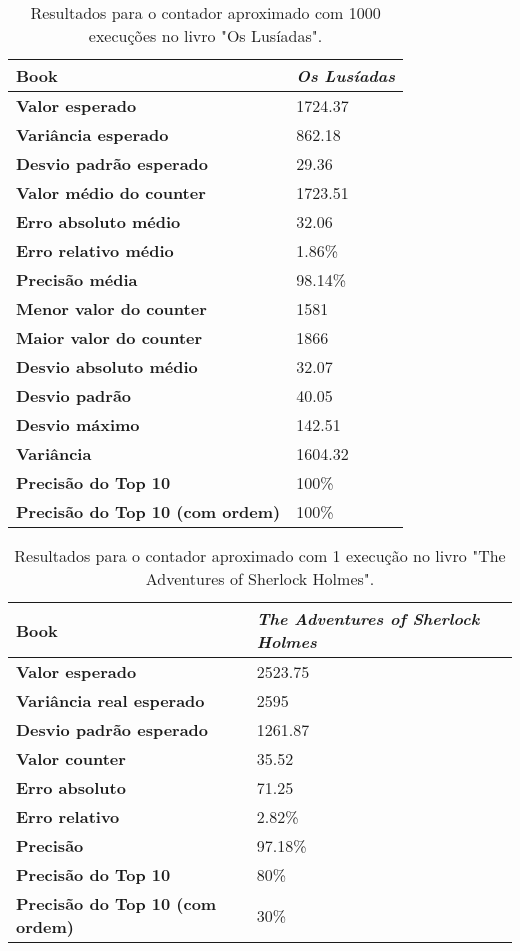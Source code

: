 \documentclass[shortpaper, portugues, times, mirror]{revdetua}
\begin{document}
\begin{table}[h!]
\centering
\begin{tabular}{|l|l|}
\hline
\textbf{Book}            & \textit{Os Lusíadas}\\ \hline
\textbf{Valor esperado}         & 1724.37\\ \hline
\textbf{Variância esperado}       & 862.18\\ \hline
\textbf{Desvio padrão esperado}   & 29.36\\ \hline
\textbf{Valor médio do counter}   & 1723.51\\ \hline
\textbf{Erro absoluto médio}   & 32.06\\ \hline
\textbf{Erro relativo médio}   & 1.86\%\\ \hline
\textbf{Precisão média}   & 98.14\%\\ \hline
\textbf{Menor valor do counter}   & 1581\\ \hline
\textbf{Maior valor do counter}   & 1866\\ \hline
\textbf{Desvio absoluto médio}   & 32.07\\ \hline
\textbf{Desvio padrão}   & 40.05\\ \hline
\textbf{Desvio máximo}   & 142.51\\ \hline
\textbf{Variância}   & 1604.32\\ \hline
\textbf{Precisão do Top 10}   & 100\%\\ \hline
\textbf{Precisão do Top 10 (com ordem)}   & 100\%\\ \hline
\end{tabular}
\caption{Resultados para o contador aproximado com 1000 execuções no livro "Os Lusíadas".}
\label{tab:approximate}
\end{table}

\begin{table}[H]
\centering
\begin{tabular}{|l|p{2cm}|}
\hline
\textbf{Book}            & \textit{The Adventures of Sherlock Holmes}\\ \hline
\textbf{Valor esperado}         & 2523.75\\ \hline
\textbf{Variância real esperado}       & 2595\\ \hline
\textbf{Desvio padrão esperado}   & 1261.87\\ \hline
\textbf{Valor counter}   & 35.52\\ \hline
\textbf{Erro absoluto}   & 71.25\\ \hline
\textbf{Erro relativo}   & 2.82\%\\ \hline
\textbf{Precisão}   & 97.18\%\\ \hline
\textbf{Precisão do Top 10}   & 80\%\\ \hline
\textbf{Precisão do Top 10 (com ordem)}   & 30\%\\ \hline
\end{tabular}
\caption{Resultados para o contador aproximado com 1 execução no livro "The Adventures of Sherlock Holmes".}
\label{tab:approximate}
\end{table}
\end{document}
